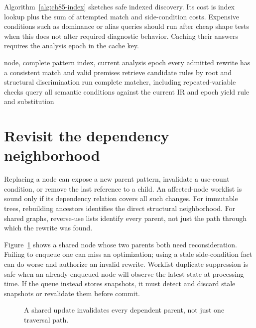 Algorithm~\ref{alg:ch85-index} sketches safe indexed discovery.
Its cost is index lookup plus the sum of attempted match and side-condition costs.
Expensive conditions such as dominance or alias queries should run after cheap shape tests when this does not alter required diagnostic behavior.
Caching their answers requires the analysis epoch in the cache key.

\begin{algorithm}[htbp]
\caption{Discover candidates through an overapproximating pattern index.}
\label{alg:ch85-index}
\begin{pseudocode}
\Require node, complete pattern index, current analysis epoch
\Ensure every admitted rewrite has a consistent match and valid premises
\State retrieve candidate rules by root and structural discrimination
\State run complete matcher, including repeated-variable checks
\State query all semantic conditions against the current IR and epoch
 \State yield rule and substitution \EndIf
\EndIf
\EndFor
\end{pseudocode}
\end{algorithm}

\section{Revisit the dependency neighborhood}
\label{sec:ch85-worklist}
Replacing a node can expose a new parent pattern, invalidate a use-count condition, or remove the last reference to a child.
An affected-node worklist is sound only if its dependency relation covers all such changes.
For immutable trees, rebuilding ancestors identifies the direct structural neighborhood.
For shared graphs, reverse-use lists identify every parent, not just the path through which the rewrite was found.

Figure~\ref{fig:ch85-users} shows a shared node whose two parents both need reconsideration.
Failing to enqueue one can miss an optimization; using a stale side-condition fact can do worse and authorize an invalid rewrite.
Worklist duplicate suppression is safe when an already-enqueued node will observe the latest state at processing time.
If the queue instead stores snapshots, it must detect and discard stale snapshots or revalidate them before commit.

\begin{figure}[htbp]
\centering
{}
\caption{A shared update invalidates every dependent parent, not just one traversal path.}
\label{fig:ch85-users}
\end{figure}

